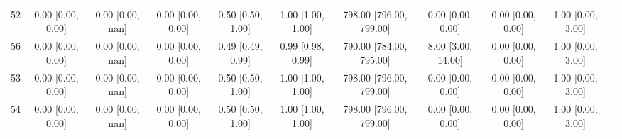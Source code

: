 \documentclass[8pt]{article}
\begin{document}
\begin{center}
\begin{footnotesize}
\begin{longtable}{|ccccccccccc|}
 52 &  0.00 [0.00, 0.00] &  0.00 [0.00, nan] &  0.00 [0.00, 0.00] &  0.50 [0.50, 1.00] &  1.00 [1.00, 1.00] &  798.00 [796.00, 799.00] &        0.00 [0.00, 0.00] &  0.00 [0.00, 0.00] &  1.00 [0.00, 3.00] \\
 56 &  0.00 [0.00, 0.00] &  0.00 [0.00, nan] &  0.00 [0.00, 0.00] &  0.49 [0.49, 0.99] &  0.99 [0.98, 0.99] &  790.00 [784.00, 795.00] &       8.00 [3.00, 14.00] &  0.00 [0.00, 0.00] &  1.00 [0.00, 3.00] \\
 53 &  0.00 [0.00, 0.00] &  0.00 [0.00, nan] &  0.00 [0.00, 0.00] &  0.50 [0.50, 1.00] &  1.00 [1.00, 1.00] &  798.00 [796.00, 799.00] &        0.00 [0.00, 0.00] &  0.00 [0.00, 0.00] &  1.00 [0.00, 3.00] \\
 54 &  0.00 [0.00, 0.00] &  0.00 [0.00, nan] &  0.00 [0.00, 0.00] &  0.50 [0.50, 1.00] &  1.00 [1.00, 1.00] &  798.00 [796.00, 799.00] &        0.00 [0.00, 0.00] &  0.00 [0.00, 0.00] &  1.00 [0.00, 3.00] \\
\end{longtable}
\end{footnotesize}
\end{center}
\end{document}
